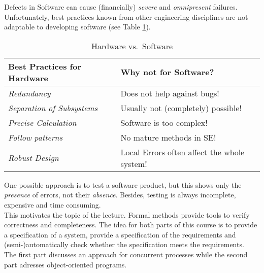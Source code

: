 Defects in Software can cause (financially) \emph{severe} and \emph{omnipresent} failures. Unfortunately, best practices known from other engineering disciplines are not adaptable to developing software (see Table \ref{T:HwSw}).

\begin{table}[h]
\centering
\caption{Hardware vs.\ Software}
\label{T:HwSw}

\begin{tabular}{|l|l|}
\hline
\textbf{Best Practices for Hardware} & \textbf{Why not for Software?} \\
\hline
\emph{Redundancy} & Does not help against bugs! \\
\emph{Separation of Subsystems} & Usually not (completely) possible! \\
\emph{Precise Calculation} & Software is too complex! \\
\emph{Follow patterns} & No mature methods in SE! \\
\emph{Robust Design} & Local Errors often affect the whole system! \\
\hline
\end{tabular}
\end{table}

One possible approach is to test a software product, but this shows only the \emph{presence} of errors, not their \emph{absence}. Besides, testing is always incomplete, expensive and time consuming.\\

This motivates the topic of the lecture. Formal methods provide tools to verify correctness and completeness. The idea for both parts of this course is to provide a specification of a system, provide a specification of the requirements and (semi-)automatically check whether the specification meets the requirements.\\
The first part discusses an approach for concurrent processes while the second part adresses object-oriented programs.